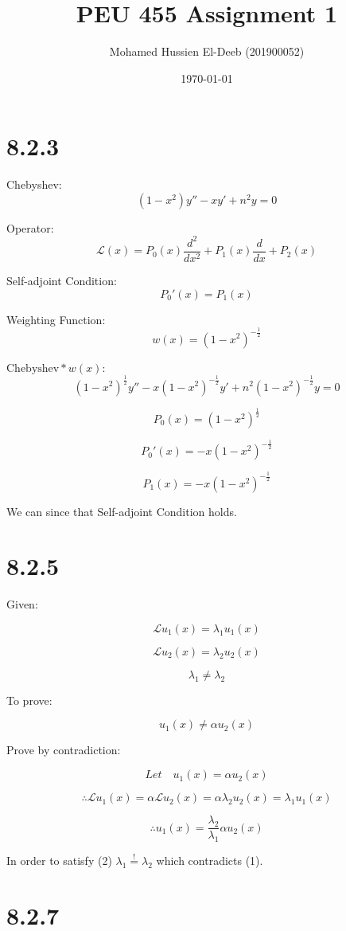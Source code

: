 \documentclass[12pt]{article}
\title{PEU 455 Assignment 1}
\author{Mohamed Hussien El-Deeb (201900052)}
\date{\today}
\begin{document}
\maketitle
\tableofcontents

\newcommand{\Lagr}{\mathcal{L}}

\section{8.2.3}

Chebyshev:
\[(1-x^2)y''-xy'+n^2y=0\]

Operator:
\[\Lagr(x)=P_0(x)\frac{d^2}{dx^2}+P_1(x)\frac{d}{dx}+P_2(x)\]

Self-adjoint Condition:
\[P_0'(x) = P_1(x)\]

Weighting Function:
\[w(x)={(1-x^2)}^{-\frac{1}{2}}\]

$\text{Chebyshev}*w(x)$:
\[
    {(1-x^2)}^{\frac{1}{2}}y''-x{(1-x^2)}^{-\frac{1}{2}}y'+n^2{(1-x^2)}^{-\frac{1}{2}}y=0
\]

\[
    P_0(x)={(1-x^2)}^{\frac{1}{2}}
\]

\[
    P_0'(x)= -x{(1-x^2)}^{-\frac{1}{2}}
\]

\[
    P_1(x)= -x{(1-x^2)}^{-\frac{1}{2}}
\]

We can since that Self-adjoint Condition holds.

\newpage
\section{8.2.5}

Given:

\[
    \Lagr u_1(x) = \lambda_1 u_1(x)
\]

\[
    \Lagr u_2(x) = \lambda_2 u_2(x)
\]

\[
    \lambda_1 \neq \lambda_2 \tag{1}
\]

To prove:

\[
    u_1(x) \neq \alpha u_2(x)
\]

Prove by contradiction:

\[
    Let\quad u_1(x) = \alpha u_2(x) \tag{2}
\]

\[
    \therefore \Lagr u_1(x) = \alpha \Lagr u_2(x) = \alpha \lambda_2 u_2(x) = \lambda_1 u_1(x)
\]

\[
    \therefore u_1(x) = \frac{\lambda_2}{\lambda_1} \alpha u_2(x)
\]

In order to satisfy (2) $\lambda_1 \overset{!}{=} \lambda_2$ which contradicts (1).

\newpage
\section{8.2.7}
\end{document}
